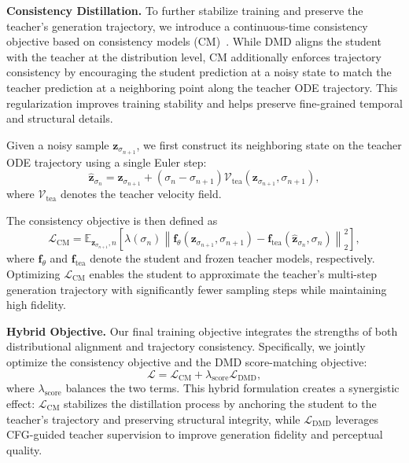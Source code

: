 \textbf{Consistency Distillation.}
To further stabilize training and preserve the teacher's generation trajectory, we introduce a continuous-time consistency objective based on consistency models (CM)~\cite{song2023consistencymodels,lu2025simplifyingstabilizingscalingcontinuoustime,zheng2026largescalediffusiondistillation}. While DMD aligns the student with the teacher at the distribution level, CM additionally enforces trajectory consistency by encouraging the student prediction at a noisy state to match the teacher prediction at a neighboring point along the teacher ODE trajectory. This regularization improves training stability and helps preserve fine-grained temporal and structural details.

Given a noisy sample $\mathbf{z}_{\sigma_{n+1}}$, we first construct its neighboring state on the teacher ODE trajectory using a single Euler step:
\begin{equation}
\hat{\mathbf{z}}_{\sigma_n}
=
\mathbf{z}_{\sigma_{n+1}}
+
(\sigma_n-\sigma_{n+1})
\mathcal{V}_{\text{tea}}
(\mathbf{z}_{\sigma_{n+1}},\sigma_{n+1}),
\end{equation}
where $\mathcal{V}_{\text{tea}}$ denotes the teacher velocity field.

The consistency objective is then defined as
\begin{equation}
\mathcal{L}_{\text{CM}}
=
\mathbb{E}_{\mathbf{z}_{\sigma_{n+1}},n}
\left[
\lambda(\sigma_n)
\left\|
\mathbf{f}_{\theta}
(\mathbf{z}_{\sigma_{n+1}},\sigma_{n+1})
-
\mathbf{f}_{\text{tea}}
(\hat{\mathbf{z}}_{\sigma_n},\sigma_n)
\right\|_2^2
\right],
\end{equation}
where $\mathbf{f}_{\theta}$ and $\mathbf{f}_{\text{tea}}$ denote the student and frozen teacher models, respectively. Optimizing $\mathcal{L}_{\text{CM}}$ enables the student to approximate the teacher's multi-step generation trajectory with significantly fewer sampling steps while maintaining high fidelity.

\textbf{Hybrid Objective.}
Our final training objective integrates the strengths of both distributional alignment and trajectory consistency. Specifically, we jointly optimize the consistency objective and the DMD score-matching objective:
\begin{equation}
\mathcal{L}
=
\mathcal{L}_{\text{CM}}
+
\lambda_{\text{score}}
\mathcal{L}_{\text{DMD}},
\end{equation}
where $\lambda_{\text{score}}$ balances the two terms. This hybrid formulation creates a synergistic effect: $\mathcal{L}_{\text{CM}}$ stabilizes the distillation process by anchoring the student to the teacher's trajectory and preserving structural integrity, while $\mathcal{L}_{\text{DMD}}$ leverages CFG-guided teacher supervision to improve generation fidelity and perceptual quality.

